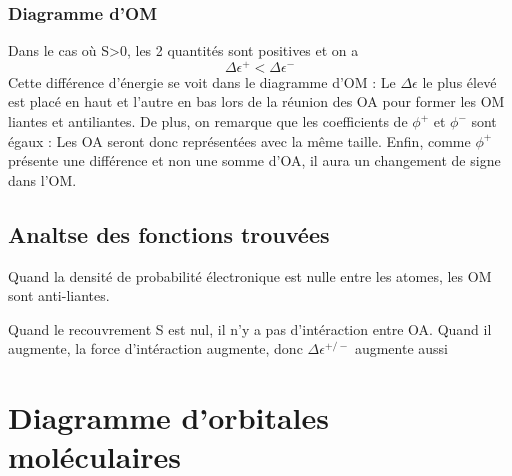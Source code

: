 \documentclass[french]{yLectureNote}
\begin{document}
\subsubsection{Diagramme d'OM}
Dans le cas où S>0, les 2 quantités sont positives et on a \[\Delta\epsilon^+< \Delta \epsilon^-\]Cette différence d'énergie se voit dans le diagramme d'OM : Le \(\Delta \epsilon\) le plus élevé est placé en haut et l'autre en bas lors de la réunion des OA pour former les OM liantes et antiliantes. De plus, on remarque que les coefficients de \(\phi^+\) et \(\phi^-\) sont égaux : Les OA seront donc représentées avec la m\^eme taille. Enfin, comme \(\phi^+\) présente une différence et non une somme d'OA, il aura un changement de signe dans l'OM.
\subsection{Analtse des fonctions trouvées}
Quand la densité de probabilité électronique est nulle entre les atomes, les OM sont anti-liantes.

Quand le recouvrement S est nul, il n'y a pas d'intéraction entre OA. Quand il augmente, la force d'intéraction augmente, donc \(\Delta \epsilon^{+/-}\) augmente aussi
\section{Diagramme d'orbitales moléculaires}
\end{document}
